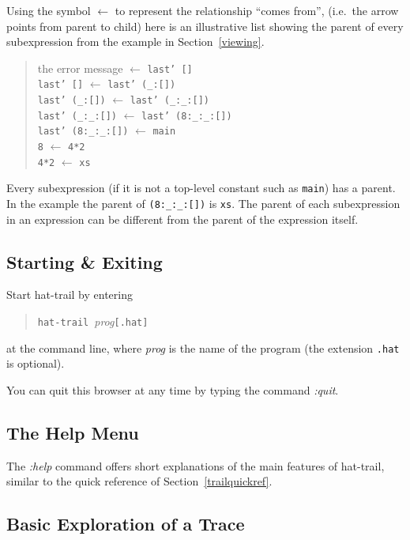 \documentclass[12pt]{article}
\begin{document}
Using the symbol $\leftarrow$ to represent the relationship ``comes
from'', (i.e.\ the arrow points from parent to child) here is an
illustrative list showing the parent of every subexpression from the
example in Section~\ref{viewing}.

\begin{quote}
the error message $\leftarrow$ \texttt{last' []}\\
\texttt{last' []} $\leftarrow$ \texttt{last' (\_:[])}\\
\texttt{last' (\_:[])} $\leftarrow$ \texttt{last' (\_:\_:[])}\\
\texttt{last' (\_:\_:[])} $\leftarrow$ \texttt{last' (8:\_:\_:[])}\\
\texttt{last' (8:\_:\_:[])} $\leftarrow$ \texttt{main}\\
\texttt{8} $\leftarrow$ \texttt{4*2}\\
\texttt{4*2} $\leftarrow$ \texttt{xs}\\
\end{quote}

Every subexpression (if it is not a top-level constant such
as \texttt{main}) has a parent. In the example the parent of
\texttt{(8:\_:\_:[])} is \texttt{xs}.  The parent of each subexpression
in an expression can be different from the parent of the expression
itself.



\subsection{Starting \& Exiting}

Start hat-trail by entering
\begin{quote}
\texttt{hat-trail}~\emph{prog}\texttt{[.hat]}
\end{quote}
at the command line, where \emph{prog} is the name of the program
(the extension \texttt{.hat} is optional).

You can quit this browser at any time by typing the command \emph{:quit}.

\subsection{The Help Menu}

The \emph{:help} command offers short explanations of the main
features of hat-trail, similar to the quick reference of
Section~\ref{trailquickref}.

\subsection{Basic Exploration of a Trace}
\end{document}
